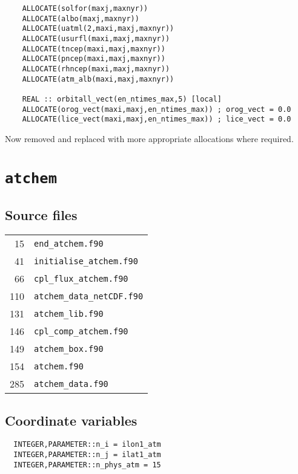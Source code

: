 \documentclass[a4paper,10pt,article]{memoir}
\begin{document}
\begin{verbatim}
    ALLOCATE(solfor(maxj,maxnyr))
    ALLOCATE(albo(maxj,maxnyr))
    ALLOCATE(uatml(2,maxi,maxj,maxnyr))
    ALLOCATE(usurfl(maxi,maxj,maxnyr))
    ALLOCATE(tncep(maxi,maxj,maxnyr))
    ALLOCATE(pncep(maxi,maxj,maxnyr))
    ALLOCATE(rhncep(maxi,maxj,maxnyr))
    ALLOCATE(atm_alb(maxi,maxj,maxnyr))

    REAL :: orbitall_vect(en_ntimes_max,5) [local]
    ALLOCATE(orog_vect(maxi,maxj,en_ntimes_max)) ; orog_vect = 0.0
    ALLOCATE(lice_vect(maxi,maxj,en_ntimes_max)) ; lice_vect = 0.0
\end{verbatim}

Now removed and replaced with more appropriate allocations where
required.

\chapter{\texttt{atchem}}

\section{Source files}

\begin{tabular}{rl}
   15 & \texttt{end\_atchem.f90} \\
   41 & \texttt{initialise\_atchem.f90} \\
   66 & \texttt{cpl\_flux\_atchem.f90} \\
  110 & \texttt{atchem\_data\_netCDF.f90} \\
  131 & \texttt{atchem\_lib.f90} \\
  146 & \texttt{cpl\_comp\_atchem.f90} \\
  149 & \texttt{atchem\_box.f90} \\
  154 & \texttt{atchem.f90} \\
  285 & \texttt{atchem\_data.f90} \\
\end{tabular}

\section{Coordinate variables}

\begin{verbatim}
  INTEGER,PARAMETER::n_i = ilon1_atm
  INTEGER,PARAMETER::n_j = ilat1_atm
  INTEGER,PARAMETER::n_phys_atm = 15
\end{verbatim}
\end{document}
